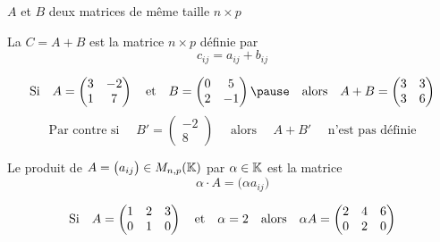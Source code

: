 \begin{frame}

$A$ et $B$ deux matrices de même taille $n\times p$

\begin{mydefinition}
La  $C=A+B$ est la matrice $n\times p$ définie par 
\[c_{ij}=a_{ij}+b_{ij}\]
\end{mydefinition}

\pause
\begin{exemple}
\[
\text{Si} \quad 
A  =  \begin{pmatrix}
3 & -2\\
1 & 7                         
\end{pmatrix}
\quad \text{et} \quad 
B = \begin{pmatrix}
0 & 5 \\
2 & -1      
    \end{pmatrix}  
    \pause
    \quad \text{alors} \quad A + B = \begin{pmatrix}
3 & 3\\
3 & 6                 
\end{pmatrix}
\]
\pause
\[
\text{Par contre si } \quad
B' =  \begin{pmatrix}
-2\\8  \end{pmatrix}
\quad \text{ alors } \quad A+B' \quad \text{ n'est pas définie}
\]
\end{exemple}

\end{frame}


\begin{frame}


\begin{mydefinition}
Le produit de $A=\big(a_{ij}\big)\in M_{n,p}(\mathbb{K})$ 
par $\alpha \in \mathbb{K}$ est la matrice 
\[\alpha \cdot A = \big(\alpha a_{ij}\big)
\]
\end{mydefinition}

\pause

\begin{exemple}
$$
\text{Si} \quad 
A  = \begin{pmatrix} 
1& 2 & 3\cr 
0& 1& 0\cr
\end{pmatrix}
\quad \text{et} \quad \alpha = 2
\quad \text{alors} \quad
\alpha A =
\begin{pmatrix} 
2& 4 & 6\cr 
0& 2& 0\cr
\end{pmatrix}$$
\end{exemple}


\end{frame}


